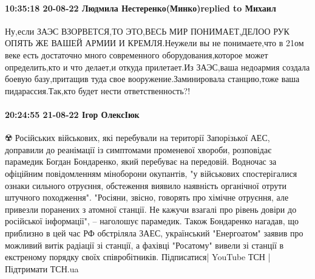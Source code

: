  
 
 
 
 

\paragraph{10:35:18 20-08-22 Людмила Нестеренко(Минко)replied to Михаил}

Ну,если ЗАЭС ВЗОРВЕТСЯ,ТО ЭТО,ВЕСЬ МИР ПОНИМАЕТ,ДЕЛОО РУК ОПЯТЬ ЖЕ ВАШЕЙ АРМИИ
И КРЕМЛЯ.Неужели вы не понимаете,что в 21ом веке есть достаточно много
современного оборудования,которое может определить,кто и что делает,и откуда
прилетает.Из ЗАЭС,ваша недоармия создала боевую базу,притащив туда свое
вооружение.Заминировала станцию,тоже ваша пидарассия.Так,кто будет нести
ответственность?!

\paragraph{20:24:55 21-08-22 Ігор ОлексІюк}

☢️ Російських військових, які перебували на території Запорізької АЕС, доправили до реанімації із симптомами променевої хвороби, розповідає парамедик Богдан Бондаренко, який перебуває на передовій. Водночас за офіційним повідомленням міноборони окупантів, "у військових спостерігалися ознаки сильного отруєння, обстеження виявило наявність органічної отрути штучного походження".
"Росіяни, звісно, говорять про хімічне отруєння, але привезли поранених з атомної станції. Не кажучи взагалі про рівень довіри до російської інформації", – наголошує парамедик. Також Бондаренко нагадав, що приблизно в цей час РФ обстріляла ЗАЕС, український "Енергоатом" заявив про можливий витік радіації зі станції, а фахівці "Росатому" вивели зі станції в екстреному порядку своїх співробітників.
Підписатися| YouTube ТСН | Підтримати ТСН.ua
